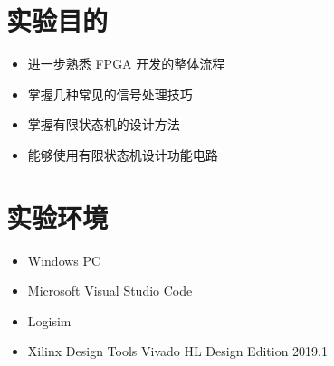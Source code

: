 \documentclass[UTF8,fontset=fandol]{ctexart}
\begin{document}
\section*{实验目的}
\begin{itemize}
    \item 进一步熟悉 FPGA 开发的整体流程
    \item 掌握几种常见的信号处理技巧
    \item 掌握有限状态机的设计方法
    \item 能够使用有限状态机设计功能电路
\end{itemize}
\section*{实验环境}
\begin{itemize}
    \item Windows PC
    \item Microsoft Visual Studio Code
    \item Logisim
    \item Xilinx Design Tools Vivado HL Design Edition 2019.1 
\end{itemize}
\end{document}
